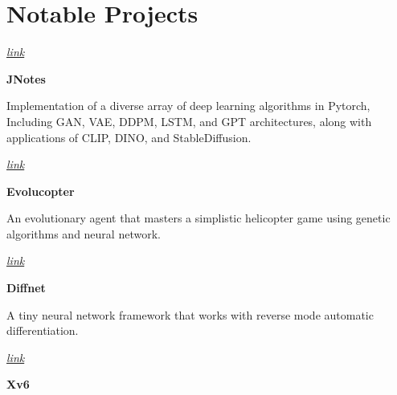 	\section{Notable Projects}




\begin{twocolentry}{
		
		
		\textit{\href{https://github.com/mehrdad3301/jnotes}{link}}}
	\textbf{JNotes}
\end{twocolentry}

\vspace{0.10 cm}
\begin{onecolentry}
	Implementation of a diverse array of deep learning algorithms in Pytorch, Including GAN, VAE, DDPM, LSTM, and GPT architectures, along with applications of CLIP, DINO, and StableDiffusion. 
\end{onecolentry}


\vspace{0.2 cm}

\begin{twocolentry}{
		
		
		\textit{\href{https://github.com/mehrdad3301/EvoluCop}{link}}}
	\textbf{Evolucopter}
\end{twocolentry}

\vspace{0.10 cm}
\begin{onecolentry}
	An evolutionary agent that masters a simplistic helicopter game using genetic algorithms and neural network.  
\end{onecolentry}


\vspace{0.2 cm}

\begin{twocolentry}{
		
		\textit{\href{https://github.com/mehrdad3301/diff-Net}{link}}}
	\textbf{Diffnet}
\end{twocolentry}

\vspace{0.10 cm}
\begin{onecolentry}
	A tiny neural network framework that works with reverse mode automatic differentiation. 
\end{onecolentry}

\vspace{0.2 cm}

\begin{twocolentry}{
		
		
		\textit{\href{https://github.com/mehrdad3301/xv6}{link}}}
	\textbf{Xv6}
\end{twocolentry}

